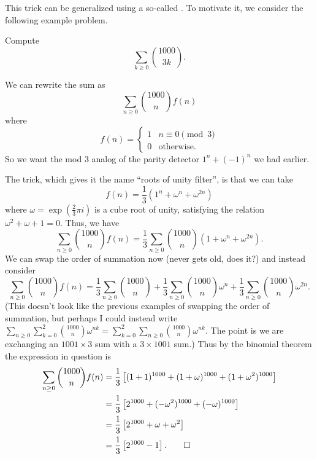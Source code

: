 \documentclass[11pt]{scrartcl}
\begin{document}
This trick can be generalized using a so-called .
To motivate it, we consider the following example problem.
\begin{example}
  Compute
  \[ \sum_{k \ge 0} \binom{1000}{3k}. \]
\end{example}
\begin{soln}
  We can rewrite the sum as
  \[ \sum_{n \ge 0} \binom{1000}{n} f(n) \]
  where
  \[ f(n) = \begin{cases}
      1 & n \equiv 0 \pmod 3 \\
      0 & \text{otherwise}.
    \end{cases} \]
  So we want the mod $3$ analog of the parity detector $1^n + (-1)^n$ we had earlier.

  The trick, which gives it the name ``roots of unity filter'',
  is that we can take
  \[ f(n) = \frac{1}{3} \left( 1^n + \omega^n + \omega^{2n} \right) \]
  where $\omega = \exp\left( \frac23\pi i \right)$ is a cube root of unity,
  satisfying the relation $\omega^2 + \omega + 1 = 0$.
  Thus, we have
  \[
    \sum_{n \ge 0} \binom{1000}{n} f(n)
    = \frac13 \sum_{n \ge 0} \binom{1000}{n} (1+\omega^{n}+\omega^{2n}).
  \]
  We can swap the order of summation now
  (never gets old, does it?)
  and instead consider
  \[
    \sum_{n \ge 0} \binom{1000}{n} f(n)
    = \frac13 \sum_{n \ge 0} \binom{1000}{n}
    + \frac13 \sum_{n \ge 0} \binom{1000}{n} \omega^n
    + \frac13 \sum_{n \ge 0} \binom{1000}{n} \omega^{2n}.
  \]
  (This doesn't look like the previous examples of swapping the order
  of summation, but perhaps I could instead write
  $\sum_{n \ge 0} \sum_{k=0}^2 \binom{1000}{n} \omega^{nk}
  = \sum_{k=0}^2 \sum_{n \ge 0} \binom{1000}{n} \omega^{nk}$.
  The point is we are exchanging an $1001 \times 3$ sum
  with a $3 \times 1001$ sum.)
  Thus by the binomial theorem the expression in question is
  \begin{align*}
    \sum_{n \ge 0} \binom{1000}{n} f(n) &= \frac13
    \left[ (1+1)^{1000} + (1+\omega)^{1000} + (1+\omega^2)^{1000} \right] \\
    &= \frac13
    \left[ 2^{1000} + (-\omega^2)^{1000} + (-\omega)^{1000} \right] \\
    &= \frac13
    \left[ 2^{1000} + \omega + \omega^2 \right] \\
    &= \frac13 \left[ 2^{1000} - 1 \right]. \qedhere
  \end{align*}
\end{soln}
\end{document}
